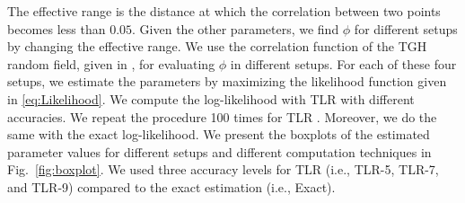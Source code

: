 \documentclass[conference]{IEEEtran}
\begin{document}
The effective range is the distance at which the correlation between two points becomes less than $0.05$. Given the other parameters, we find $\phi$ for different setups by changing the effective range. We use the correlation function of the TGH random field, given in \cite{xu2017tukey}, for evaluating $\phi$ in different setups. 
For each of these four setups, we estimate the parameters by maximizing the likelihood function given in \eqref{eq:Likelihood}. We compute the log-likelihood with TLR with different accuracies. We repeat the procedure 100 times for TLR . Moreover, we do the same with the exact log-likelihood. We present the boxplots of the estimated parameter values for different setups and different computation techniques in Fig.~\ref{fig:boxplot}. We used three accuracy levels for TLR (i.e., TLR-5, TLR-7, and TLR-9) compared to the exact estimation (i.e., Exact).
\end{document}
